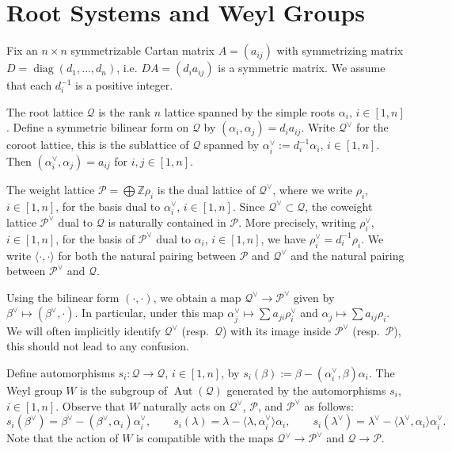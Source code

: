 \documentclass{amsart}
\numberwithin{theorem}{section}
\newcommand{\cP}{\mathcal{P}}
\newcommand{\cQ}{\mathcal{Q}}
\newcommand{\ZZ}{\mathbb{Z}}
\newcommand{\Aut}{\operatorname{Aut}}
\newcommand{\diag}{\operatorname{diag}}
\begin{document}
  \section{Root Systems and Weyl Groups}
    Fix an $n\times n$ symmetrizable Cartan matrix $A=(a_{ij})$ with symmetrizing matrix $D=\diag(d_1,\ldots,d_n)$, i.e. $DA=(d_ia_{ij})$ is a symmetric matrix.
    We assume that each $d_i^{-1}$ is a positive integer.

    The root lattice $\cQ$ is the rank $n$ lattice spanned by the simple roots $\alpha_i$, $i\in[1,n]$.
    Define a symmetric bilinear form on $\cQ$ by $(\alpha_i,\alpha_j)=d_ia_{ij}$.
    Write $\cQ^\vee$ for the coroot lattice, this is the sublattice of $\cQ$ spanned by $\alpha_i^\vee:=d_i^{-1}\alpha_i$, $i\in[1,n]$.
    Then $(\alpha_i^\vee,\alpha_j)=a_{ij}$ for $i,j\in[1,n]$.

    The weight lattice $\cP=\bigoplus\ZZ\rho_i$ is the dual lattice of $\cQ^\vee$, where we write $\rho_i$, $i\in[1,n]$, for the basis dual to $\alpha_i^\vee$, $i\in[1,n]$.
    Since $\cQ^\vee\subset\cQ$, the coweight lattice $\cP^\vee$ dual to $\cQ$ is naturally contained in $\cP$.
    More precisely, writing $\rho_i^\vee$, $i\in[1,n]$, for the basis of $\cP^\vee$ dual to $\alpha_i$, $i\in[1,n]$, we have $\rho_i^\vee=d_i^{-1}\rho_i$.
    We write $\langle\cdot,\cdot\rangle$ for both the natural pairing between $\cP$ and $\cQ^\vee$ and the natural pairing between $\cP^\vee$ and $\cQ$.

    Using the bilinear form $(\cdot,\cdot)$, we obtain a map $\cQ^\vee\to\cP^\vee$ given by $\beta^\vee\mapsto (\beta^\vee,\cdot)$.
    In particular, under this map $\alpha_j^\vee\mapsto \sum a_{ji}\rho_i^\vee$ and $\alpha_j\mapsto \sum a_{ij}\rho_i$.
    We will often implicitly identify $\cQ^\vee$ (resp.\ $\cQ$) with its image inside $\cP^\vee$ (resp.\ $\cP$), this should not lead to any confusion.

    Define automorphisms $s_i:\cQ\to\cQ$, $i\in[1,n]$, by $s_i(\beta):=\beta-(\alpha_i^\vee,\beta)\alpha_i$.
    The Weyl group $W$ is the subgroup of $\Aut(\cQ)$ generated by the automorphisms $s_i$, $i\in[1,n]$.
    Observe that $W$ naturally acts on $\cQ^\vee$, $\cP$, and $\cP^\vee$ as follows:
    \[s_i(\beta^\vee)=\beta^\vee-(\beta^\vee,\alpha_i)\alpha_i^\vee,\qquad s_i(\lambda)=\lambda-\langle\lambda,\alpha_i^\vee\rangle\alpha_i,\qquad s_i(\lambda^\vee)=\lambda^\vee-\langle\lambda^\vee,\alpha_i\rangle\alpha_i^\vee.\]
    Note that the action of $W$ is compatible with the maps $\cQ^\vee\to\cP^\vee$ and $\cQ\to\cP$.
\end{document}
